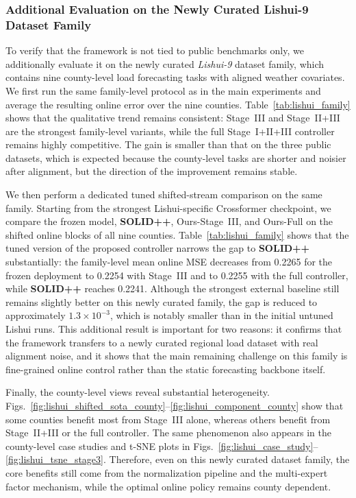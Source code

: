 ﻿\documentclass[journal]{IEEEtran}
\newenvironment{auditproblemblock}{\begingroup\color{red}}{\endgroup}
\begin{document}
\begin{auditproblemblock}
\subsubsection{Additional Evaluation on the Newly Curated Lishui-9 Dataset Family}
To verify that the framework is not tied to public benchmarks only, we additionally evaluate it on the newly curated \textit{Lishui-9} dataset family, which contains nine county-level load forecasting tasks with aligned weather covariates. We first run the same family-level protocol as in the main experiments and average the resulting online error over the nine counties. Table~\ref{tab:lishui_family} shows that the qualitative trend remains consistent: Stage~III and Stage~II+III are the strongest family-level variants, while the full Stage~I+II+III controller remains highly competitive. The gain is smaller than that on the three public datasets, which is expected because the county-level tasks are shorter and noisier after alignment, but the direction of the improvement remains stable.

We then perform a dedicated tuned shifted-stream comparison on the same family. Starting from the strongest Lishui-specific Crossformer checkpoint, we compare the frozen model, \textbf{SOLID++}, Ours-Stage~III, and Ours-Full on the shifted online blocks of all nine counties. Table~\ref{tab:lishui_family} shows that the tuned version of the proposed controller narrows the gap to \textbf{SOLID++} substantially: the family-level mean online MSE decreases from 0.2265 for the frozen deployment to 0.2254 with Stage~III and to 0.2255 with the full controller, while \textbf{SOLID++} reaches 0.2241. Although the strongest external baseline still remains slightly better on this newly curated family, the gap is reduced to approximately $1.3\times 10^{-3}$, which is notably smaller than in the initial untuned Lishui runs. This additional result is important for two reasons: it confirms that the framework transfers to a newly curated regional load dataset with real alignment noise, and it shows that the main remaining challenge on this family is fine-grained online control rather than the static forecasting backbone itself.

Finally, the county-level views reveal substantial heterogeneity. Figs.~\ref{fig:lishui_shifted_sota_county}--\ref{fig:lishui_component_county} show that some counties benefit most from Stage~III alone, whereas others benefit from Stage~II+III or the full controller. The same phenomenon also appears in the county-level case studies and t-SNE plots in Figs.~\ref{fig:lishui_case_study}--\ref{fig:lishui_tsne_stage3}. Therefore, even on this newly curated dataset family, the core benefits still come from the normalization pipeline and the multi-expert factor mechanism, while the optimal online policy remains county dependent.


\end{auditproblemblock}
\end{document}
